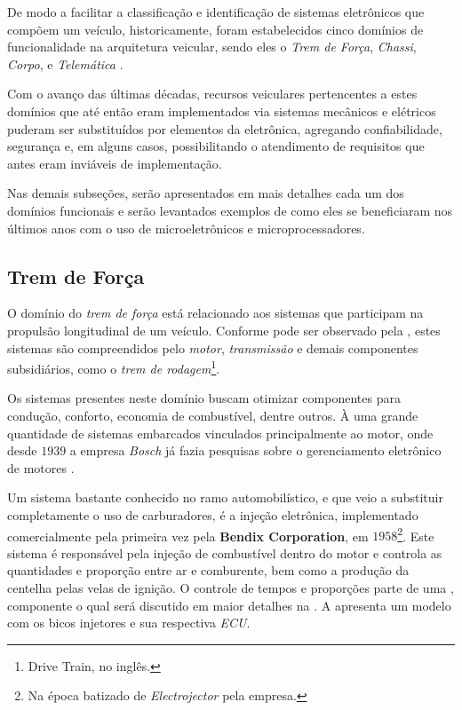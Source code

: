 De modo a facilitar a classificação e identificação de sistemas eletrônicos que compõem um veículo, historicamente, foram estabelecidos cinco domínios de funcionalidade na arquitetura veicular, sendo eles o \emph{Trem de Força}, \emph{Chassi}, \emph{Corpo},  e \emph{Telemática} \cite{Auto:Lion2008}.

Com o avanço das últimas décadas, recursos veiculares pertencentes a estes domínios que até então eram implementados via sistemas mecânicos e elétricos puderam ser substituídos por elementos da eletrônica, agregando confiabilidade, segurança e, em alguns casos, possibilitando o atendimento de requisitos que antes eram inviáveis de implementação.

Nas demais subseções, serão apresentados em mais detalhes cada um dos domínios funcionais e serão levantados exemplos de como eles se beneficiaram nos últimos anos com o uso de microeletrônicos e microprocessadores.

\subsection{Trem de Força}

O domínio do \emph{trem de força} está relacionado aos sistemas que participam na propulsão longitudinal de um veículo. Conforme pode ser observado pela , estes sistemas são compreendidos pelo \emph{motor}, \emph{transmissão} e demais componentes subsidiários, como o \emph{trem de rodagem}\footnote{Drive Train, no inglês.}.


Os sistemas presentes neste domínio buscam otimizar componentes para condução, conforto, economia de combustível, dentre outros. À uma grande quantidade de sistemas embarcados vinculados principalmente ao motor, onde desde $1939$ a empresa \emph{Bosch} já fazia pesquisas sobre o gerenciamento eletrônico de motores \cite{BoschHistory}.

Um sistema bastante conhecido no ramo automobilístico, e que veio a substituir completamente o uso de carburadores, é a injeção eletrônica, implementado comercialmente pela primeira vez pela \textbf{Bendix Corporation}, em $1958$\footnote{Na época batizado de \emph{Electrojector} pela empresa.}\cite{Electrojector}. Este sistema é responsável pela injeção de combustível dentro do motor e controla as quantidades e proporção entre ar e comburente, bem como a produção da centelha pelas velas de ignição. O controle de tempos e proporções parte de uma , componente o qual será discutido em maior detalhes na . A  apresenta um modelo com os bicos injetores e sua respectiva \emph{ECU}.

